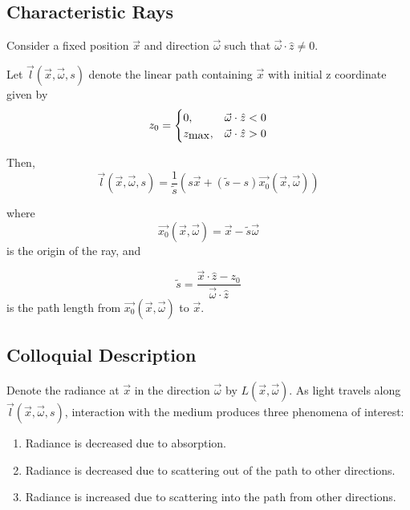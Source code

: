 \subsection{Characteristic Rays}
Consider a fixed position $\vec{x}$ and direction $\vec{\omega}$ such that
$\vec{\omega} \cdot \hat{z} \neq 0$.


Let $\vec{l}(\vec{x}, \vec{\omega}, s)$ denote the linear path containing $\vec{x}$
with initial z coordinate given by
\begin{equation}
  z_0 =
   \begin{cases}
    0, & \vec{\omega} \cdot \hat{z} < 0 \\
    z_{\mbox{max}}, & \vec{\omega} \cdot \hat{z} > 0
  \end{cases}
\end{equation}

Then,
\begin{equation}
  \vec{l}(\vec{x}, \vec{\omega}, s) = \frac{1}{\tilde{s}} (s\vec{x} + (\tilde{s} - s)\vec{x_0}(\vec{x}, \vec{\omega}))
\end{equation}

where
\begin{equation}
  \vec{x_0}(\vec{x}, \vec{\omega}) = \vec{x} - \tilde{s} \vec{\omega}
\end{equation}
is the origin of the ray, and 

\begin{equation}
  \tilde{s} = \frac{\vec{x} \cdot \hat{z} - z_0}{\vec{\omega} \cdot \hat{z}}
\end{equation}
is the path length from $\vec{x_0}(\vec{x}, \vec{\omega})$ to $\vec{x}$.

\subsection{Colloquial Description}
Denote the radiance at $\vec{x}$ in the direction $\vec{\omega}$ by $L(\vec{x}, \vec{\omega})$.
As light travels along $\vec{l}(\vec{x}, \vec{\omega}, s)$, interaction with the
medium produces three phenomena of interest:
\begin{enumerate}
  \item Radiance is decreased due to absorption.
  \item Radiance is decreased due to scattering out of the path to other
    directions.
  \item Radiance is increased due to scattering into the path from other
      directions.
\end{enumerate}

